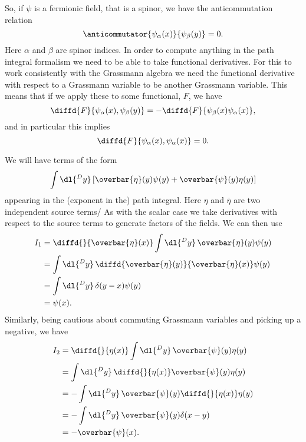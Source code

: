 \documentclass[fleqn]{NotesClass}
\newcommand{\diracadjoint}[1]{\overbar{#1}}
\begin{document}
    So, if \(\psi\) is a fermionic field, that is a spinor, we have the anticommutation relation
    \begin{equation}
        \anticommutator{\psi_\alpha(x)}{\psi_\beta(y)} = 0.
    \end{equation}
    Here \(\alpha\) and \(\beta\) are spinor indices.
    In order to compute anything in the path integral formalism we need to be able to take functional derivatives.
    For this to work consistently with the Grassmann algebra we need the functional derivative with respect to a Grassmann variable to be another Grassmann variable.
    This means that if we apply these to some functional, \(F\), we have
    \begin{equation}
        \diffd{F}{\psi_\alpha(x),\psi_\beta(y)} = -\diffd{F}{\psi_\beta(x)\psi_\alpha(x)},
    \end{equation}
    and in particular this implies
    \begin{equation}
        \diffd{F}{\psi_\alpha(x),\psi_\alpha(x)} = 0.
    \end{equation}
    
    We will have terms of the form
    \begin{equation}
        \int \dl{^Dy} \, [\diracadjoint{\eta}(y) \psi(y) + \diracadjoint{\psi}(y)\eta(y)]
    \end{equation}
    appearing in the (exponent in the) path integral.
    Here \(\eta\) and \(\diracadjoint{\eta}\) are two independent source terms/
    As with the scalar case we take derivatives with respect to the source terms to generate factors of the fields.
    We can then use
    \begin{align}
        I_1 &= \diffd{}{\diracadjoint{\eta}(x)} \int\dl{^Dy} \, \diracadjoint{\eta}(y)\psi(y)\\
        &= \int\dl{^Dy} \, \diffd{\diracadjoint{\eta}(y)}{\diracadjoint{\eta}(x)} \psi(y)\\
        &= \int\dl{^Dy} \, \delta(y - x) \psi(y)\\
        &= \psi(x).
    \end{align}
    Similarly, being cautious about commuting Grassmann variables and picking up a negative, we have
    \begin{align}
        I_2 &= \diffd{}{\eta(x)} \int\dl{^Dy} \, \diracadjoint{\psi}(y)\eta(y)\\
        &= \int \dl{^Dy} \, \diffd{}{\eta(x)} \diracadjoint{\psi}(y) \eta(y)\\
        &= - \int \dl{^Dy} \, \diracadjoint{\psi}(y) \diffd{}{\eta(x)} \eta(y)\\
        &= - \int \dl{^Dy} \, \diracadjoint{\psi}(y) \delta(x - y)\\
        &= - \diracadjoint{\psi}(x).
    \end{align}
    
\end{document}
